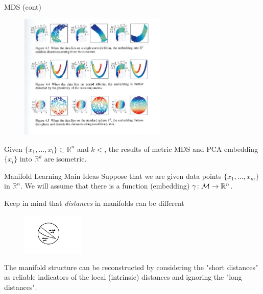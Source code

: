 \documentclass{beamer}
\begin{document}
\begin{frame}{MDS (cont)}

\begin{figure}[h]
	\centering
	\includegraphics[width=7cm]{../../Figures/fig_mds_manifold.png}
\end{figure}

\begin{theorem}
	Given $\{x_1, \ldots, x_l\}\subset \mathbb{R}^n$ and $k<$, the results of metric MDS and PCA embedding $\{x_i\}$ into $\mathbb{R}^k$ are isometric.
\end{theorem}

\end{frame}
\begin{frame}{Manifold Learning Main Ideas}
	Suppose that we are given data points $\{x_1, \ldots, x_m\}$ in $\mathbb{R}^n$. We will assume that there is a function (embedding) $\gamma \colon {\cal M} \to \mathbb{R}^n$. 
	
	Keep in mind that \textit{distances} in manifolds can be different
\begin{figure}[h]
	\centering
	\includegraphics[width=3cm]{../../Figures/fig_geodesic.jpg}
\end{figure}
	The manifold structure can be reconstructed by considering the "short distances" as reliable indicators of the local (intrinsic) distances and ignoring the "long distances".
	

\end{frame}
\end{document}
